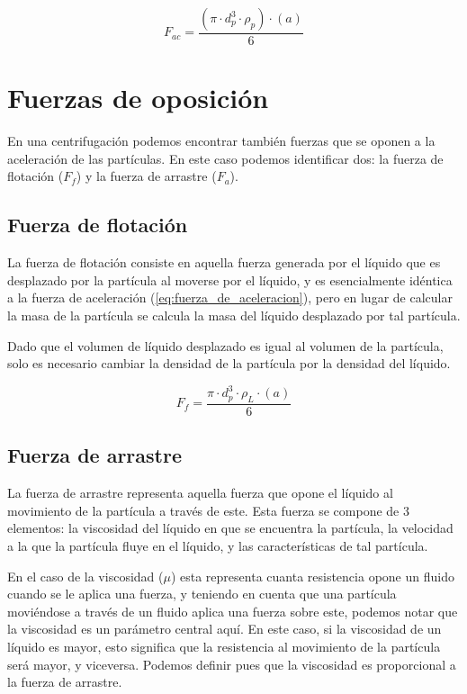 \documentclass{AsignaturaResumen}
\begin{document}
\begin{equation}\label{eq:fuerza_de_aceleracion}
    F_{ac} = \frac{(\pi\cdot d_{p}^{3}\cdot\rho_{p})\cdot(a)}{6}
\end{equation}



\section{Fuerzas de oposición}

En una centrifugación podemos encontrar también fuerzas que se oponen a la aceleración de las partículas. En este caso podemos identificar dos: la fuerza de flotación ($F_{f}$) y la fuerza de arrastre ($F_{a}$).\citep{tejedamansirBioseparaciones2011}



\subsection{Fuerza de flotación}

La fuerza de flotación consiste en aquella fuerza generada por el líquido que es desplazado por la partícula al moverse por el líquido, y es esencialmente idéntica a la fuerza de aceleración (\autoref{eq:fuerza_de_aceleracion}), pero en lugar de calcular la masa de la partícula se calcula la masa del líquido desplazado por tal partícula. 

Dado que el volumen de líquido desplazado es igual al volumen de la partícula, solo es necesario cambiar la densidad de la partícula por la densidad del líquido.

\begin{equation}\label{eq:fuerza_de_flotacion}
    F_{f} = \frac{\pi\cdot d_{p}^{3}\cdot\rho_{L}\cdot(a)}{6}
\end{equation}



\subsection{Fuerza de arrastre}

La fuerza de arrastre representa aquella fuerza que opone el líquido al movimiento de la partícula a través de este. Esta fuerza se compone de 3 elementos: la viscosidad del líquido en que se encuentra la partícula, la velocidad a la que la partícula fluye en el líquido, y las características de tal partícula.

En el caso de la viscosidad ($\mu$) esta representa cuanta resistencia opone un fluido cuando se le aplica una fuerza, y teniendo en cuenta que una partícula moviéndose a través de un fluido aplica una fuerza sobre este, podemos notar que la viscosidad es un parámetro central aquí. En este caso, si la viscosidad de un líquido es mayor, esto significa que la resistencia al movimiento de la partícula será mayor, y viceversa. Podemos definir pues que la viscosidad es proporcional a la fuerza de arrastre.
\end{document}
